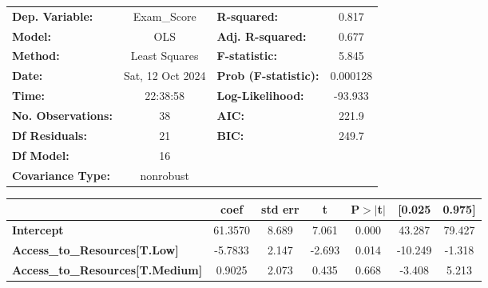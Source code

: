 \documentclass[11pt]{article}
\newcommand{\prompt}[4]{
        {\ttfamily\llap{{\color{#2}[#3]:\hspace{3pt}#4}}\vspace{-\baselineskip}}
    }
\begin{document}
            
\prompt{Out}{outcolor}{351}{}
    
    \begin{center}
\begin{tabular}{lclc}
\toprule
\textbf{Dep. Variable:}                             &   Exam\_Score    & \textbf{  R-squared:         } &     0.817   \\
\textbf{Model:}                                     &       OLS        & \textbf{  Adj. R-squared:    } &     0.677   \\
\textbf{Method:}                                    &  Least Squares   & \textbf{  F-statistic:       } &     5.845   \\
\textbf{Date:}                                      & Sat, 12 Oct 2024 & \textbf{  Prob (F-statistic):} &  0.000128   \\
\textbf{Time:}                                      &     22:38:58     & \textbf{  Log-Likelihood:    } &   -93.933   \\
\textbf{No. Observations:}                          &          38      & \textbf{  AIC:               } &     221.9   \\
\textbf{Df Residuals:}                              &          21      & \textbf{  BIC:               } &     249.7   \\
\textbf{Df Model:}                                  &          16      & \textbf{                     } &             \\
\textbf{Covariance Type:}                           &    nonrobust     & \textbf{                     } &             \\
\bottomrule
\end{tabular}
\begin{tabular}{lcccccc}
                                                    & \textbf{coef} & \textbf{std err} & \textbf{t} & \textbf{P$> |$t$|$} & \textbf{[0.025} & \textbf{0.975]}  \\
\midrule
\textbf{Intercept}                                  &      61.3570  &        8.689     &     7.061  &         0.000        &       43.287    &       79.427     \\
\textbf{Access\_to\_Resources[T.Low]}               &      -5.7833  &        2.147     &    -2.693  &         0.014        &      -10.249    &       -1.318     \\
\textbf{Access\_to\_Resources[T.Medium]}            &       0.9025  &        2.073     &     0.435  &         0.668        &       -3.408    &        5.213     \\

\end{tabular}
\end{center}
\end{document}
